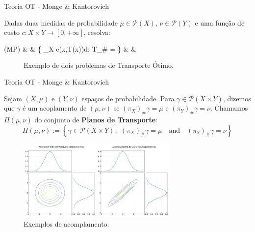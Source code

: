 \documentclass[10pt]{beamer}
\begin{document}
\begin{frame}[fragile]{Teoria OT - Monge \& Kantorovich}

	\begin{definition}
		Dadas duas medidas de probabilidade $\mu \in \mathcal P(X)$,
		$\nu \in \mathcal{P}(Y)$ e uma função de custo
		$c:X\times Y \to[0,+\infty]$, resolva:
		\begin{flalign}
			(MP)     &  &
			\inf
			\left\{
			\int_{X} c(x,T(x))d\mu \quad : \quad
			T_\# \mu = \nu
			\right\} &  &
		\end{flalign}

	\end{definition}

	\begin{figure}[H]
		\centering
		\def\svgscale{0.45}
		
		\caption{Exemplo de dois problemas de Transporte Ótimo.}
		\label{fig:monge_map_example}
	\end{figure}

\end{frame}

\begin{frame}[fragile]{Teoria OT - Monge \& Kantorovich}

	\begin{definition}
		Sejam $(X,\mu)$ e $(Y,\nu)$ espaços de probabilidade. Para
		$\gamma \in \mathcal{P}(X\times Y)$, dizemos que $\gamma$
		é um acoplamento de $(\mu,\nu)$ se $(\pi_X)_\# \gamma = \mu$
		e $(\pi_Y)_\# \gamma = \nu$. Chamamos $\Pi(\mu,\nu)$
		do conjunto de \textbf{Planos de Transporte}:
		\begin{equation}
			\Pi(\mu,\nu) :=
			\left \{
			\gamma \in \mathcal{P}(X \times Y) \ :
			\ (\pi_X)_\# \gamma = \mu \quad
			\text{and} \quad
			(\pi_Y)_\# \gamma = \nu
			\right \}
		\end{equation}
	\end{definition}

	\begin{figure}[H]
		\begin{center}
			\includegraphics[width=0.7\textwidth]{Figures/coupling.pdf}
		\end{center}
		\caption{Exemplos de acomplamento.}
	\end{figure}

\end{frame}
\end{document}
